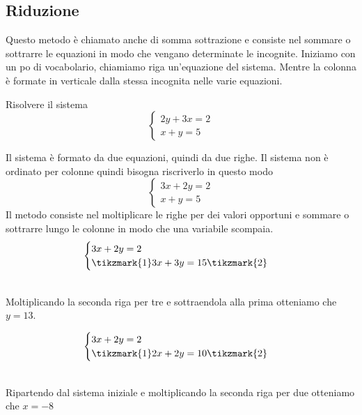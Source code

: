 \subsection{Riduzione}
\label{sec:Riduzionesist}
Questo metodo è chiamato anche di somma sottrazione e consiste nel sommare o sottrarre le equazioni in modo che vengano determinate le incognite. Iniziamo con un po di vocabolario, chiamiamo riga un'equazione del sistema. Mentre la colonna è formate in verticale dalla stessa incognita nelle varie equazioni.
\begin{esempiot} {}{}
	Risolvere il sistema \[
	\begin{cases}
	2y+3x=2\\
	x+y=5
	\end{cases}\]
\end{esempiot}
Il sistema è formato da due equazioni, quindi da due righe. Il sistema non è ordinato per colonne quindi bisogna riscriverlo in questo modo \[
\begin{cases}
3x+2y=2\\
x+y=5
\end{cases}\]
Il metodo consiste nel moltiplicare le righe per dei valori  opportuni e  sommare o sottrarre lungo le colonne in modo che una variabile scompaia.
\[
\begin{cases}
3x+2y=2\\
\tikzmark{1}3x+3y=15\tikzmark{2}
\end{cases}\]
\\

Moltiplicando la seconda riga per tre e sottraendola alla prima otteniamo che $y=13$. 

\[
\begin{cases}
3x+2y=2\\
\tikzmark{1}2x+2y=10\tikzmark{2}
\end{cases}\]
\\

Ripartendo dal sistema iniziale e moltiplicando la seconda riga per due otteniamo che $x=-8$

     